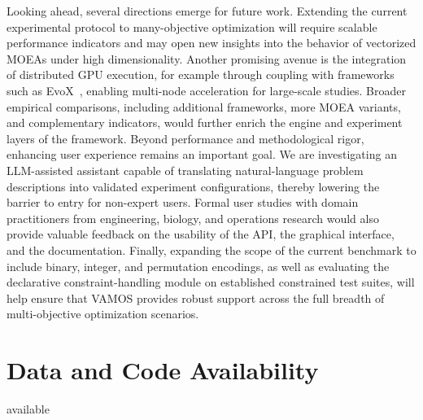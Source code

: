 \documentclass[final,5p,times,twocolumn]{elsarticle}
\newcommand{\VAMOS}{VAMOS}
\begin{document}
Looking ahead, several directions emerge for future work. Extending the current experimental protocol to many-objective optimization will require scalable performance indicators and may open new insights into the behavior of vectorized MOEAs under high dimensionality. Another promising avenue is the integration of distributed GPU execution, for example through coupling with frameworks such as EvoX~\cite{HCL+25}, enabling multi-node acceleration for large-scale studies. Broader empirical comparisons, including additional frameworks, more MOEA variants, and complementary indicators, would further enrich the engine and experiment layers of the framework. Beyond performance and methodological rigor, enhancing user experience remains an important goal. We are investigating an LLM-assisted assistant capable of translating natural-language problem descriptions into validated experiment configurations, thereby lowering the barrier to entry for non-expert users. Formal user studies with domain practitioners from engineering, biology, and operations research would also provide valuable feedback on the usability of the API, the graphical interface, and the documentation. Finally, expanding the scope of the current benchmark to include binary, integer, and permutation encodings, as well as evaluating the declarative constraint-handling module on established constrained test suites, will help ensure that \VAMOS{} provides robust support across the full breadth of multi-objective optimization scenarios.

\section*{Data and Code Availability}

 available 



\begingroup
\markrevisionreferences

\endgroup
\end{document}
